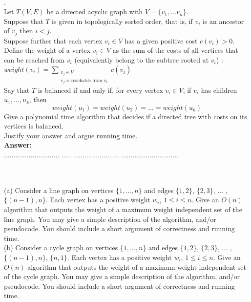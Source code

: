 \documentclass{article}
\begin{document}
\noindent
{}\\


.\\
Let $T(V,E)$ be a directed acyclic graph with $V=\{ v_1 , \ldots v_n \}$.\\
Suppose that $T$ is given in topologically sorted order, that is, 
if $v_i$ is an ancestor of $v_j$ then $i<j$.\\
Suppose further that  each vertex $v_i \in V$ has a given positive cost $c(v_i) > 0$. 
Define the weight of a vertex $v_i \in V$ as the sum of the costs of all vertices that can be reached from $v_i$
(equivalently belong to the subtree rooted at $v_i$) : 
$weight (v_i) = \sum_{
\begin{array}{c}
v_j \in V : \\ \mbox{$v_j$ is reachable from $v_i$} \end{array}
}  c(v_j)$\\
Say that $T$ is balanced if and only if, for every vertex $v_i \in V$,
if $v_i$ has children $u_1 , \ldots , u_k$, then 
$$
weight(u_1 ) = weight(u_2) = \ldots = weight(u_k)
$$
Give a polynomial time algorithm that decides if a directed tree with costs on its vertices is balanced. \\
Justify your answer and argue running time.\\

\noindent
{\bf Answer:}\\

\pagebreak
{} $.............................$
 $..............................$
          $..............................$

\noindent
{}\\

\\
(a) Consider a line graph on vertices $\{ 1 , \ldots , n \}$
and edges $\{ 1 , 2 \}$, $\{ 2 , 3 \}$, ... , $\{ (n-1) , n \}$. 
Each vertex has a positive weight $w_i$, $1 \leq i \leq n$. 
Give an $O(n)$ algorithm that outputs the weight of a maximum weight independent set of the line graph. 
You may give a simple description of the algorithm, and/or pseudocode. 
You should include a short argument of correctness and running time.\\
(b) Consider a cycle graph on vertices $\{ 1 , \ldots , n \}$
and edges $\{ 1 , 2 \}$, $\{ 2 , 3 \}$, ... , $\{ (n-1) , n \}$, $\{ n , 1 \}$.
Each vertex has a positive weight $w_i$, $1 \leq i \leq n$. 
Give an $O(n)$ algorithm that outputs the weight of a maximum weight independent set of the cycle graph. 
You may give a simple description of the algorithm, and/or pseudocode. 
You should include a short argument of correctness and running time.\\
\end{document}
